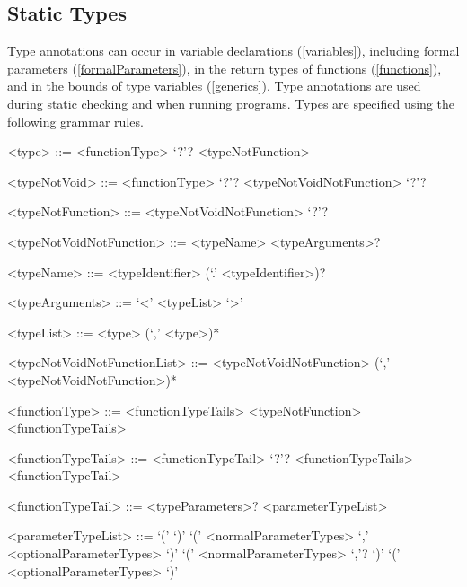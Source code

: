 \documentclass[makeidx]{article}
\begin{document}
{\subsection{Static Types}

\LMHash{}%
Type annotations can occur in variable declarations (\ref{variables}),
including formal parameters (\ref{formalParameters}),
in the return types of functions (\ref{functions}),
and in the bounds of type variables (\ref{generics}).
Type annotations are used during static checking and when running programs.
Types are specified using the following grammar rules.



\begin{grammar}

<type> ::= <functionType> `?'?
  \alt <typeNotFunction>

<typeNotVoid> ::= <functionType> `?'?
  \alt <typeNotVoidNotFunction> `?'?

<typeNotFunction> ::= \VOID{}
  \alt <typeNotVoidNotFunction> `?'?

<typeNotVoidNotFunction> ::= <typeName> <typeArguments>?
  \alt \FUNCTION{}

<typeName> ::= <typeIdentifier> (`.' <typeIdentifier>)?

<typeArguments> ::= `<' <typeList> `>'

<typeList> ::= <type> (`,' <type>)*

<typeNotVoidNotFunctionList> ::= \gnewline{}
  <typeNotVoidNotFunction> (`,' <typeNotVoidNotFunction>)*

<functionType> ::= <functionTypeTails>
  \alt <typeNotFunction> <functionTypeTails>

<functionTypeTails> ::= <functionTypeTail> `?'? <functionTypeTails>
  \alt <functionTypeTail>

<functionTypeTail> ::= \FUNCTION{} <typeParameters>? <parameterTypeList>

<parameterTypeList> ::= `(' `)'
  \alt `(' <normalParameterTypes> `,' <optionalParameterTypes> `)'
  \alt `(' <normalParameterTypes> `,'? `)'
  \alt `(' <optionalParameterTypes> `)'


\end{grammar}}
\end{document}
